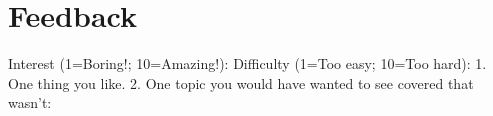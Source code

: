 \section*{Feedback}
\vspace*{-0.15in}
Interest (1=Boring!; 10=Amazing!):
Difficulty (1=Too easy; 10=Too hard):
\eprob
{}
1. One thing you like. 2. One topic you would have wanted to see covered that
wasn't:\\
\eprob


